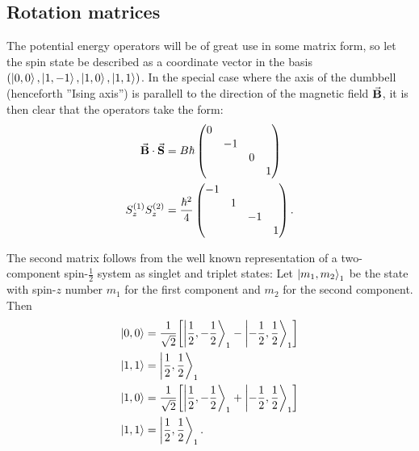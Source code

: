 \documentclass[a4paper]{article}
\begin{document}
\subsection{Rotation matrices}
The potential energy operators will be of great use in some matrix form, so let the spin
state be described as a coordinate vector in the basis \((\ket{0, 0}, \ket{1, -1}, \ket{1, 0},
\ket{1, 1})\). In the special case where the axis of the dumbbell (henceforth ''Ising
axis'') is parallell to the direction of the magnetic field \(\va{B}\), it is then clear that the operators take the form:
\begin{align}
        \va{B}\cdot \va{S} &= B\hbar \label{eq:BSmat}
        \begin{pmatrix}
        \dmat{0,-1,0,1}
        \end{pmatrix} \\
        S^{(1)}_{z}S^{(2)}_{z} &= \frac{\hbar^2}{4} \label{eq:SSmat}
        \begin{pmatrix} 
        \diagonalmatrix{-1,1,-1,1}\end{pmatrix} 
.\end{align}

The second matrix follows from the well known representation of a two-component
spin-\(\frac{1}{2}\) system as singlet and triplet states: Let \(\ket{m_1, m_2}_1\) be the
state with spin-\(z\) number \(m_1\) for the first component and \(m_2\) for the second
component. Then
\begin{align*}
    \ket{0, 0} &= \frac{1}{\sqrt{2}}\bqty{\ket{\frac{1}{2}, -\frac{1}{2}}_1 -
                \ket{-\frac{1}{2}, \frac{1}{2}}_1}\\
    \ket{1, 1} &= \ket{\frac{1}{2}, \frac{1}{2}}_1\\
    \ket{1, 0} &= \frac{1}{\sqrt{2} }\bqty{\ket{\frac{1}{2}, -\frac{1}{2}}_1 +
            \ket{-\frac{1}{2}, \frac{1}{2}}_1}\\
    \ket{1, 1} &= \ket{\frac{1}{2}, \frac{1}{2}}_1
.\end{align*}
\end{document}
